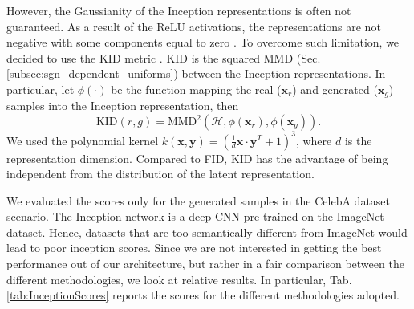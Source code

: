 However, the Gaussianity of the Inception representations is often not guaranteed. As a result of the ReLU activations, the representations are not negative with some components equal to zero \cite{KID}. To overcome such limitation, we decided to use the KID metric \cite{KID}. 
KID is the squared MMD (Sec.\ref{subsec:sgn_dependent_uniforms}) between the Inception representations. In particular, let $\phi(\cdot)$ be the function mapping the real ($\mathbf{x}_r$) and generated ($\mathbf{x}_g$) samples into the Inception representation, then
\begin{equation}
\text{KID}(r,g) = \text{MMD}^2(\mathcal{H},\phi(\mathbf{x}_r),\phi(\mathbf{x}_g)).
\end{equation}
We used the polynomial kernel $k(\mathbf{x},\mathbf{y})=(\frac{1}{d} \mathbf{x}\cdot \mathbf{y}^T +1)^3$, where $d$ is the representation dimension. Compared to FID, KID has the advantage of being independent from the distribution of the latent representation.

We evaluated the scores only for the generated samples in the CelebA dataset scenario. The Inception network is a deep CNN  pre-trained on the ImageNet dataset. Hence, datasets that are too semantically different from ImageNet would lead to poor inception scores.
Since we are not interested in getting the best performance out of our architecture, but rather in a fair comparison between the different methodologies, we look at relative results. In particular, Tab. \ref{tab:InceptionScores} reports the scores for the different methodologies adopted. 

